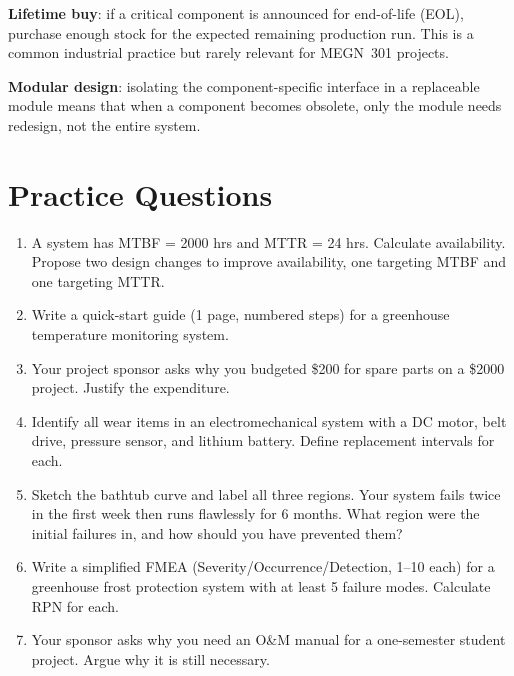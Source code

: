\textbf{Lifetime buy}: if a critical component is announced for end-of-life (EOL), purchase enough stock for the expected remaining production run. This is a common industrial practice but rarely relevant for MEGN~301 projects.

\textbf{Modular design}: isolating the component-specific interface in a replaceable module means that when a component becomes obsolete, only the module needs redesign, not the entire system.
\section{Practice Questions}
\begin{enumerate}[leftmargin=1.5em]
\item A system has MTBF = 2000 hrs and MTTR = 24 hrs. Calculate availability. Propose two design changes to improve availability, one targeting MTBF and one targeting MTTR.
\item Write a quick-start guide (1 page, numbered steps) for a greenhouse temperature monitoring system.
\item Your project sponsor asks why you budgeted \$200 for spare parts on a \$2000 project. Justify the expenditure.
\item Identify all wear items in an electromechanical system with a DC motor, belt drive, pressure sensor, and lithium battery. Define replacement intervals for each.
\item Sketch the bathtub curve and label all three regions. Your system fails twice in the first week then runs flawlessly for 6 months. What region were the initial failures in, and how should you have prevented them?
\item Write a simplified FMEA (Severity/Occurrence/Detection, 1--10 each) for a greenhouse frost protection system with at least 5 failure modes. Calculate RPN for each.
\item Your sponsor asks why you need an O\&M manual for a one-semester student project. Argue why it is still necessary.
\end{enumerate}

